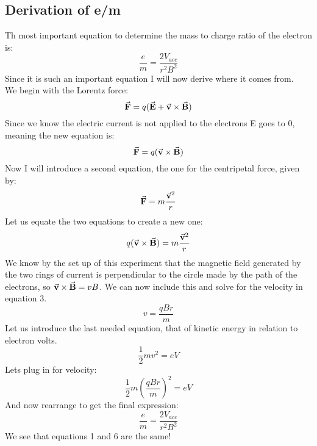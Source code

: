 \documentclass[aps,prl,10pt,twocolumn,floatfix]{revtex4-2}
\begin{document}
\subsection{Derivation of e/m}
Th most important equation to determine the mass to charge ratio of the electron is:
\begin{equation}
\frac{e}{m}=\frac{2V_{acc}}{r^2B^2}
\end{equation}
Since it is such an important equation I will now derive where it comes from. \\
We begin with the Lorentz force:
\begin{equation}
\va{F}=q(\va{E}+\va{v}\times \va{B})
\end{equation}
Since we know the electric current is not applied to the electrons E goes to 0, meaning the new equation is:
\begin{equation*}
\va{F}=q(\va{v}\times \va{B})
\end{equation*}
Now I will introduce a second equation, the one for the centripetal force, given by:
\begin{equation*}
\va{F}=m\frac{\va{v}^2}{r}
\end{equation*}
Let us equate the two equations to create a new one:
\begin{equation}
q(\va{v}\times \va{B})=m\frac{\va{v}^2}{r}
\end{equation}
We know by the set up of this experiment that the magnetic field generated by the two rings of current is perpendicular to the circle made by the path of the electrons, so $\va{v}\times \va{B}=vB$.
We can now include this and solve for the velocity in equation 3.
\begin{equation}
v=\frac{qBr}{m}
\end{equation}
Let us introduce the last needed equation, that of kinetic energy in relation to electron volts. 
\begin{equation}
\frac{1}{2}mv^2=eV
\end{equation}
Lets plug in for velocity:
\begin{equation*}
\frac{1}{2}m(\frac{qBr}{m})^2=eV
\end{equation*}
And now rearrange to get the final expression:
\begin{equation}
\frac{e}{m}=\frac{2V_{acc}}{r^2B^2}
\end{equation}
We see that equations 1 and 6 are the same!
\end{document}

